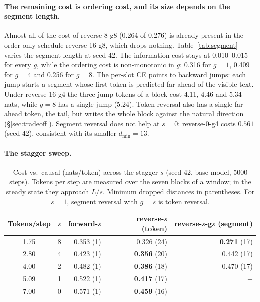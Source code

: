 \documentclass[11pt]{article}
\theoremstyle{definition}
\theoremstyle{remark}
\newcommand{\sch}[1]{\textsf{#1}}
\newcommand{\dmin}{d_{\min}}
\begin{document}
\paragraph{The remaining cost is ordering cost, and its size depends on the segment length.}
Almost all of the cost of \sch{reverse-8-g8} (0.264 of 0.276) is already present in the order-only schedule \sch{reverse-16-g8}, which drops nothing.
Table~\ref{tab:segment} varies the segment length at seed 42.
The information cost stays at 0.010--0.015 for every $g$, while the ordering cost is non-monotonic in $g$: 0.316 for $g=1$, 0.409 for $g=4$ and 0.256 for $g=8$.
The per-slot CE points to backward jumps: each jump starts a segment whose first token is predicted far ahead of the visible text.
Under \sch{reverse-16-g4} the three jump tokens of a block cost 4.11, 4.46 and 5.34 nats, while $g=8$ has a single jump (5.24).
Token reversal also has a single far-ahead token, the tail, but writes the whole block against the natural direction (\S\ref{sec:tradeoff}).
Segment reversal does not help at $s=0$: \sch{reverse-0-g4} costs $0.561$ (seed 42), consistent with its smaller $\dmin=13$.


\paragraph{The stagger sweep.}
\begin{table}[t]
  \centering
  \caption{Cost vs.\ causal (nats/token) across the stagger $s$ (seed 42, base model, 5000 steps). Tokens per step are measured over the seven blocks of a window; in the steady state they approach $L/s$. Minimum dropped distances in parentheses. For $s=1$, segment reversal with $g=s$ is token reversal.}
  \label{tab:tradeoff}
  \small
  \begin{tabular}{crrrr}
    \toprule
    Tokens/step & $s$ & \sch{forward-$s$} & \sch{reverse-$s$} (token) & \sch{reverse-$s$-g$s$} (segment) \\
    \midrule
    1.75 & 8 & 0.353 (1) & 0.326 (24) & \textbf{0.271} (17) \\
    2.80 & 4 & 0.423 (1) & \textbf{0.356} (20) & 0.442 (17) \\
    4.00 & 2 & 0.482 (1) & \textbf{0.386} (18) & 0.470 (17) \\
    5.09 & 1 & 0.522 (1) & \textbf{0.417} (17) & $-$ \\
    7.00 & 0 & 0.571 (1) & \textbf{0.459} (16) & $-$ \\
    \bottomrule
  \end{tabular}
\end{table}
\end{document}
